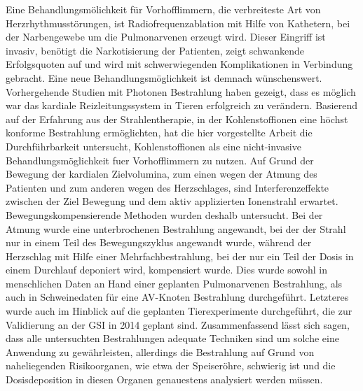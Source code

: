 \documentclass[type=dr, dr=rernat, accentcolor=tud7b,colorbacktitle, bigchapter, openright, twoside, 12pt ]{tudthesis}
\begin{document}
Eine Behandlungsm\"olichkeit f\"ur Vorhofflimmern, die verbreiteste Art von Herzrhythmusst\"orungen, ist Radiofrequenzablation mit Hilfe von 
Kathetern, bei der Narbengewebe um die Pulmonarvenen erzeugt wird. Dieser Eingriff ist invasiv, ben\"otigt die Narkotisierung der Patienten, 
zeigt schwankende Erfolgsquoten auf und wird mit schwerwiegenden Komplikationen in Verbindung gebracht. Eine neue Behandlungsm\"oglichkeit 
ist demnach w\"unschenswert. Vorhergehende Studien mit Photonen Bestrahlung haben gezeigt, dass es m\"oglich war das kardiale 
Reizleitungssystem in Tieren erfolgreich zu ver\"andern. Basierend auf der Erfahrung aus der Strahlentherapie, in der Kohlenstoffionen 
eine h\"ochst konforme Bestrahlung erm\"oglichten, hat die hier vorgestellte Arbeit die Durchf\"uhrbarkeit untersucht, Kohlenstoffionen als 
eine nicht-invasive Behandlungsm\"oglichkeit fuer Vorhofflimmern zu nutzen. Auf Grund der Bewegung der kardialen Zielvolumina, zum einen 
wegen der Atmung des Patienten und zum anderen wegen des Herzschlages, sind Interferenzeffekte zwischen der Ziel Bewegung und dem aktiv 
applizierten Ionenstrahl erwartet. Bewegungskompensierende Methoden wurden deshalb untersucht. Bei der Atmung wurde eine unterbrochenen 
Bestrahlung angewandt, bei der der Strahl nur in einem Teil des Bewegungszyklus angewandt wurde, w\"ahrend der Herzschlag mit Hilfe einer 
Mehrfachbestrahlung, bei der nur ein Teil der Dosis in einem Durchlauf deponiert wird, kompensiert wurde. Dies wurde sowohl in menschlichen 
Daten an Hand einer geplanten Pulmonarvenen Bestrahlung, als auch in Schweinedaten f\"ur eine AV-Knoten Bestrahlung durchgef\"uhrt. 
Letzteres wurde auch im Hinblick auf die geplanten Tierexperimente durchgef\"uhrt, die zur Validierung an der GSI in 2014 geplant sind.
Zusammenfassend l\"asst sich sagen, dass alle untersuchten Bestrahlungen adequate Techniken sind um solche eine Anwendung zu gew\"ahrleisten, 
allerdings die Bestrahlung auf Grund von naheliegenden Risikoorganen, wie etwa der Speiser\"ohre, schwierig ist und die Dosisdeposition in diesen 
Organen genauestens analysiert werden m\"ussen. 
\end{document}
